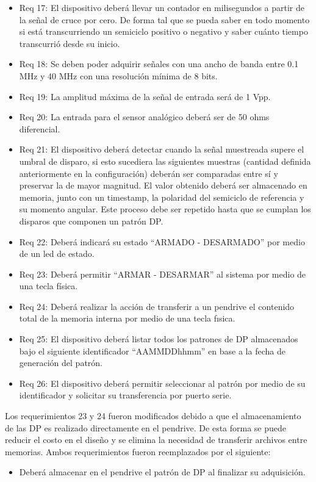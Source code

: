 \begin{itemize}
\item Req 17: El dispositivo deberá llevar un contador en milisegundos a partir de la señal de cruce por cero. De forma tal que se pueda saber en todo momento si está transcurriendo un semiciclo positivo o negativo y saber cuánto tiempo transcurrió desde su inicio.
\item Req 18: Se deben poder adquirir señales con una ancho de banda entre 0.1 MHz y 40 MHz con una resolución mínima de 8 bits.
\item Req 19: La amplitud máxima de la señal de entrada será de 1 Vpp.
\item Req 20: La entrada para el sensor analógico deberá ser de 50 ohms diferencial.
\item Req 21: El dispositivo deberá detectar cuando la señal muestreada supere el umbral de disparo, si esto sucediera las siguientes muestras (cantidad definida anteriormente en la configuración) deberán ser comparadas entre sí y preservar la de mayor magnitud. El valor obtenido deberá ser almacenado en memoria, junto con un timestamp, la polaridad del semiciclo de referencia y su momento angular. Este proceso debe ser repetido hasta que se cumplan los disparos que componen un patrón DP.
\item Req 22: Deberá indicará su estado “ARMADO - DESARMADO” por medio de un led de estado.
\item Req 23: Deberá permitir “ARMAR - DESARMAR” al sistema por medio de una tecla física.
\item Req 24: Deberá realizar la acción de transferir a un pendrive el contenido total de la memoria interna por medio de una tecla fısica.
\item Req 25: El dispositivo deberá listar todos los patrones de DP almacenados bajo el siguiente identificador “AAMMDDhhmm” en base a la fecha de generación del patrón.
\item Req 26: El dispositivo deberá permitir seleccionar al patrón por medio de su identificador y solicitar su transferencia por puerto serie.
\end{itemize}

Los requerimientos 23 y 24 fueron modificados debido a que el almacenamiento de las DP es realizado directamente en el pendrive. De esta forma se puede reducir el costo en el diseño y se elimina la necesidad de transferir archivos entre memorias. Ambos requerimientos fueron reemplazados por el siguiente:
\begin{itemize}
\item Deberá almacenar en el pendrive el patrón de DP al finalizar su adquisición.
\end{itemize}


